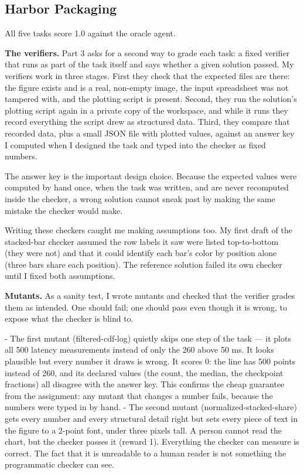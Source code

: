 \documentclass[11pt]{article}
\begin{document}
\subsection{Harbor Packaging}

All five tasks score 1.0 against the oracle agent.

\textbf{The verifiers.} Part 3 asks for a second way to grade each task: a fixed verifier that runs as part of the task itself and says whether a given solution passed. My verifiers work in three stages. First they check that the expected files are there: the figure exists and is a real, non-empty image, the input spreadsheet was not tampered with, and the plotting script is present. Second, they run the solution's plotting script again in a private copy of the workspace, and while it runs they record everything the script drew as structured data. Third, they compare that recorded data, plus a small JSON file with plotted values, against an answer key I computed when I designed the task and typed into the checker as fixed numbers.

The answer key is the important design choice. Because the expected values were computed by hand once, when the task was written, and are never recomputed inside the checker, a wrong solution cannot sneak past by making the same mistake the checker would make.

Writing these checkers caught me making assumptions too. My first draft of the stacked-bar checker assumed the row labels it saw were listed top-to-bottom (they were not) and that it could identify each bar's color by position alone (three bars share each position). The reference solution failed its own checker until I fixed both assumptions.

\textbf{Mutants.} As a sanity test, I wrote mutants and checked that the verifier grades them as intended. One should fail; one should pass even though it is wrong, to expose what the checker is blind to.

- The first mutant (filtered-cdf-log) quietly skips one step of the task --- it plots all 500 latency measurements instead of only the 260 above 50 ms. It looks plausible but every number it draws is wrong. It scores 0: the line has 500 points instead of 260, and its declared values (the count, the median, the checkpoint fractions) all disagree with the answer key. This confirms the cheap guarantee from the assignment: any mutant that changes a number fails, because the numbers were typed in by hand.
- The second mutant (normalized-stacked-share) gets every number and every structural detail right but sets every piece of text in the figure to a 2-point font, under three pixels tall. A person cannot read the chart, but the checker passes it (reward 1). Everything the checker can measure is correct. The fact that it is unreadable to a human reader is not something the programmatic checker can see.
\end{document}
